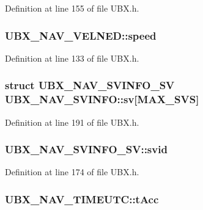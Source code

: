 Definition at line 155 of file U\-B\-X.\-h.

\hypertarget{group___g_s_p_module_ga16a2a64917c6151546e60e1eb04eb4f6}{
\subsubsection[{speed}]{ U\-B\-X\-\_\-\-N\-A\-V\-\_\-\-V\-E\-L\-N\-E\-D\-::speed}}\label{group___g_s_p_module_ga16a2a64917c6151546e60e1eb04eb4f6}


Definition at line 133 of file U\-B\-X.\-h.

\hypertarget{group___g_s_p_module_gae22f11e4be4f99b2627ff494e335a313}{
\subsubsection[{sv}]{\setlength{\rightskip}{0pt plus 5cm}struct {\bf U\-B\-X\-\_\-\-N\-A\-V\-\_\-\-S\-V\-I\-N\-F\-O\-\_\-\-S\-V} U\-B\-X\-\_\-\-N\-A\-V\-\_\-\-S\-V\-I\-N\-F\-O\-::sv\mbox{[}M\-A\-X\-\_\-\-S\-V\-S\mbox{]}}}\label{group___g_s_p_module_gae22f11e4be4f99b2627ff494e335a313}


Definition at line 191 of file U\-B\-X.\-h.

\hypertarget{group___g_s_p_module_ga95b2c35d609942ecc9257b9d1c1df03d}{
\subsubsection[{svid}]{ U\-B\-X\-\_\-\-N\-A\-V\-\_\-\-S\-V\-I\-N\-F\-O\-\_\-\-S\-V\-::svid}}\label{group___g_s_p_module_ga95b2c35d609942ecc9257b9d1c1df03d}


Definition at line 174 of file U\-B\-X.\-h.

\hypertarget{group___g_s_p_module_gadb8a5ad986f11644415dc969c0803cc9}{
\subsubsection[{t\-Acc}]{ U\-B\-X\-\_\-\-N\-A\-V\-\_\-\-T\-I\-M\-E\-U\-T\-C\-::t\-Acc}}\label{group___g_s_p_module_gadb8a5ad986f11644415dc969c0803cc9}


